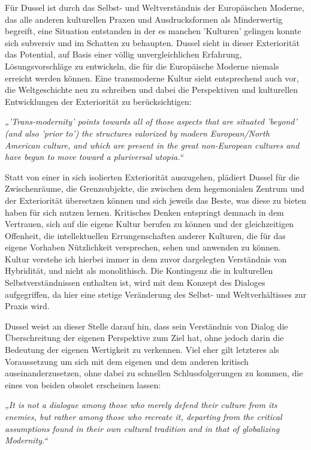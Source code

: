 Für Dussel ist durch das Selbst- und Weltverständnis der Europäischen Moderne,
das alle anderen kulturellen Praxen und Ausdrucksformen als Minderwertig
begreift, eine Situation entstanden in der es manchen 'Kulturen' gelingen konnte
sich subversiv und im Schatten zu behaupten. Dussel sieht in dieser Exteriorität
das Potential, auf Basis einer völlig unvergleichlichen Erfahrung,
Lösungsvorschläge zu entwickeln, die für die Europäische Moderne niemals
erreicht werden können. Eine transmoderne Kultur sieht entsprechend auch vor,
die Weltgeschichte neu zu schreiben und dabei die Perspektiven und kulturellen
Entwicklungen der Exteriorität zu berücksichtigen:

\begin{myenv} \textit{„'Trans-modernity' points towards all of those aspects
    that are situated 'beyond' (and also 'prior to') the structures valorized by
    modern European/North American culture, and which are present in the great
    non-European cultures and have begun to move toward a pluriversal
utopia.“\footnotemark {}} \end{myenv}

Statt von einer in sich isolierten Exteriorität auszugehen, plädiert Dussel für
die Zwischenräume, die Grenzsubjekte, die zwischen dem hegemonialen Zentrum und
der Exteriorität übersetzen können und sich jeweils das Beste, was diese zu
bieten haben für sich nutzen lernen. Kritisches Denken entspringt demnach in dem
Vertrauen, sich auf die eigene Kultur berufen zu können und der gleichzeitigen
Offenheit, die intellektuellen Errungenschaften anderer Kulturen, die für das
eigene Vorhaben Nützlichkeit versprechen, sehen und anwenden zu
können.\footnotemark {} Kultur verstehe ich hierbei immer
in dem zuvor dargelegten Verständnis von Hybridität, und nicht als monolithisch.
Die Kontingenz die in kulturellen Selbstverständnissen enthalten ist, wird mit
dem Konzept des Dialoges aufgegriffen, da hier eine stetige Veränderung des
Selbst- und Weltverhältisses zur Praxis wird.

Dussel weist an dieser Stelle darauf hin, dass sein Verständnis von Dialog die
Überschreitung der eigenen Perspektive zum Ziel hat, ohne jedoch darin die
Bedeutung der eigenen Wertigkeit zu verkennen. Viel eher gilt letzteres als
Voraussetzung um sich mit dem eigenen und dem anderen kritisch
auseinanderzusetzen, ohne dabei zu schnellen Schlussfolgerungen zu kommen, die
eines von beiden obsolet erscheinen lassen:
\begin{myenv}
    \textit{„It is not a dialogue among those who merely defend their culture
    from its enemies, but rather among those who recreate it, departing from the
    critical assumptions found in their own cultural tradition and in that of
    globalizing Modernity.“\footnotemark {}}
\end{myenv}

